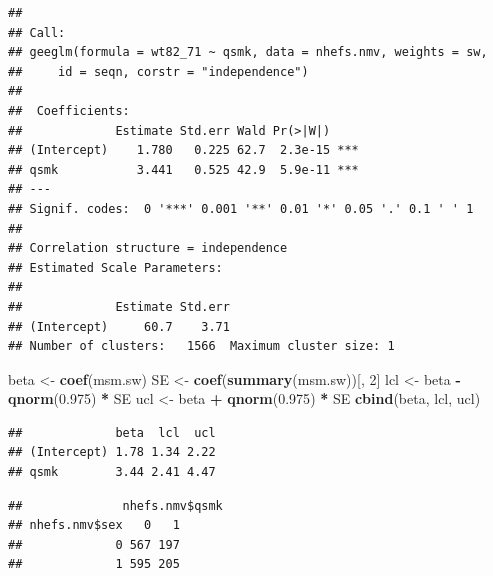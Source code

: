 \documentclass[
  10pt,
]{book}
\newenvironment{Shaded}{\begin{snugshade}}{\end{snugshade}}
\newcommand{\CommentTok}[1]{\textcolor[rgb]{0.56,0.35,0.01}{\textit{#1}}}
\newcommand{\DecValTok}[1]{\textcolor[rgb]{0.00,0.00,0.81}{#1}}
\newcommand{\FloatTok}[1]{\textcolor[rgb]{0.00,0.00,0.81}{#1}}
\newcommand{\KeywordTok}[1]{\textcolor[rgb]{0.13,0.29,0.53}{\textbf{#1}}}
\newcommand{\NormalTok}[1]{#1}
\newcommand{\OperatorTok}[1]{\textcolor[rgb]{0.81,0.36,0.00}{\textbf{#1}}}
\newcommand{\StringTok}[1]{\textcolor[rgb]{0.31,0.60,0.02}{#1}}
\begin{document}
\begin{verbatim}
## 
## Call:
## geeglm(formula = wt82_71 ~ qsmk, data = nhefs.nmv, weights = sw, 
##     id = seqn, corstr = "independence")
## 
##  Coefficients:
##             Estimate Std.err Wald Pr(>|W|)    
## (Intercept)    1.780   0.225 62.7  2.3e-15 ***
## qsmk           3.441   0.525 42.9  5.9e-11 ***
## ---
## Signif. codes:  0 '***' 0.001 '**' 0.01 '*' 0.05 '.' 0.1 ' ' 1
## 
## Correlation structure = independence 
## Estimated Scale Parameters:
## 
##             Estimate Std.err
## (Intercept)     60.7    3.71
## Number of clusters:   1566  Maximum cluster size: 1
\end{verbatim}

\begin{Shaded}
\begin{Highlighting}[]
\NormalTok{beta <-}\StringTok{ }\KeywordTok{coef}\NormalTok{(msm.sw)}
\NormalTok{SE <-}\StringTok{ }\KeywordTok{coef}\NormalTok{(}\KeywordTok{summary}\NormalTok{(msm.sw))[, }\DecValTok{2}\NormalTok{]}
\NormalTok{lcl <-}\StringTok{ }\NormalTok{beta }\OperatorTok{-}\StringTok{ }\KeywordTok{qnorm}\NormalTok{(}\FloatTok{0.975}\NormalTok{) }\OperatorTok{*}\StringTok{ }\NormalTok{SE}
\NormalTok{ucl <-}\StringTok{ }\NormalTok{beta }\OperatorTok{+}\StringTok{ }\KeywordTok{qnorm}\NormalTok{(}\FloatTok{0.975}\NormalTok{) }\OperatorTok{*}\StringTok{ }\NormalTok{SE}
\KeywordTok{cbind}\NormalTok{(beta, lcl, ucl)}
\end{Highlighting}
\end{Shaded}

\begin{verbatim}
##             beta  lcl  ucl
## (Intercept) 1.78 1.34 2.22
## qsmk        3.44 2.41 4.47
\end{verbatim}

\begin{Shaded}
\end{Shaded}

\begin{verbatim}
##              nhefs.nmv$qsmk
## nhefs.nmv$sex   0   1
##             0 567 197
##             1 595 205
\end{verbatim}
\end{document}
